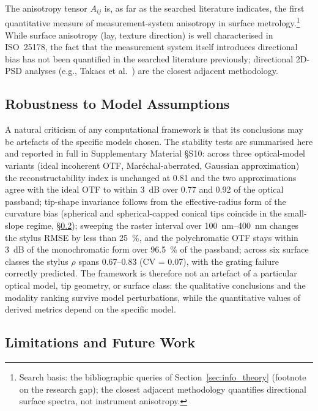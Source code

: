 \documentclass[review,12pt]{elsarticle}
\begin{document}
The anisotropy tensor $A_{ij}$ is, as far as the searched literature indicates, the first quantitative measure of measurement-system anisotropy in surface metrology.\footnote{Search basis: the bibliographic queries of Section~\ref{sec:info_theory} (footnote on the research gap); the closest adjacent methodology quantifies directional surface spectra, not instrument anisotropy.} While surface anisotropy (lay, texture direction) is well characterised in ISO~25178, the fact that the measurement system itself introduces directional bias has not been quantified in the searched literature previously; directional 2D-PSD analyses (e.g., Takacs et al.~\cite{takacs2010two}) are the closest adjacent methodology.

\subsection{Robustness to Model Assumptions}

A natural criticism of any computational framework is that its conclusions may be artefacts of the specific models chosen. The stability tests are summarised here and reported in full in Supplementary Material \S S10: across three optical-model variants (ideal incoherent OTF, Mar\'echal-aberrated, Gaussian approximation) the reconstructability index is unchanged at 0.81 and the two approximations agree with the ideal OTF to within \SI{3}{dB} over 0.77 and 0.92 of the optical passband; tip-shape invariance follows from the effective-radius form of the curvature bias (spherical and spherical-capped conical tips coincide in the small-slope regime, \S\ref{sec:limitations}); sweeping the raster interval over \SIrange{100}{400}{nm} changes the stylus RMSE by less than \SI{25}{\percent}, and the polychromatic OTF stays within \SI{3}{dB} of the monochromatic form over \SI{96.5}{\percent} of the passband; across six surface classes the stylus $\rho$ spans 0.67--0.83 (CV = 0.07), with the grating failure correctly predicted. The framework is therefore not an artefact of a particular optical model, tip geometry, or surface class: the qualitative conclusions and the modality ranking survive model perturbations, while the quantitative values of derived metrics depend on the specific model.

\subsection{Limitations and Future Work}
\label{sec:limitations}
\end{document}
